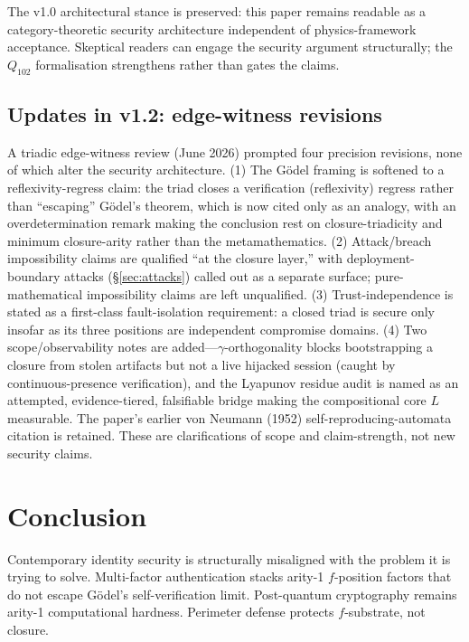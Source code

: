 \documentclass[11pt,a4paper]{article}
\theoremstyle{definition}
\theoremstyle{remark}
\begin{document}
The v1.0 architectural stance is preserved: this paper remains readable as a category-theoretic security architecture independent of physics-framework acceptance. Skeptical readers can engage the security argument structurally; the $Q_{102}$ formalisation strengthens rather than gates the claims.

\subsection{Updates in v1.2: edge-witness revisions}

A triadic edge-witness review (June 2026) prompted four precision revisions, none of which alter the security architecture. (1) The G\"odel framing is softened to a reflexivity-regress claim: the triad closes a verification (reflexivity) regress rather than ``escaping'' G\"odel's theorem, which is now cited only as an analogy, with an overdetermination remark making the conclusion rest on closure-triadicity and minimum closure-arity rather than the metamathematics. (2) Attack/breach impossibility claims are qualified ``at the closure layer,'' with deployment-boundary attacks (\S\ref{sec:attacks}) called out as a separate surface; pure-mathematical impossibility claims are left unqualified. (3) Trust-independence is stated as a first-class fault-isolation requirement: a closed triad is secure only insofar as its three positions are independent compromise domains. (4) Two scope/observability notes are added---$\gamma$-orthogonality blocks bootstrapping a closure from stolen artifacts but not a live hijacked session (caught by continuous-presence verification), and the Lyapunov residue audit is named as an attempted, evidence-tiered, falsifiable bridge making the compositional core $L$ measurable. The paper's earlier von Neumann (1952) self-reproducing-automata citation is retained. These are clarifications of scope and claim-strength, not new security claims.

\section{Conclusion}

Contemporary identity security is structurally misaligned with the problem it is trying to solve. Multi-factor authentication stacks arity-1 $f$-position factors that do not escape G\"odel's self-verification limit. Post-quantum cryptography remains arity-1 computational hardness. Perimeter defense protects $f$-substrate, not closure.
\end{document}

